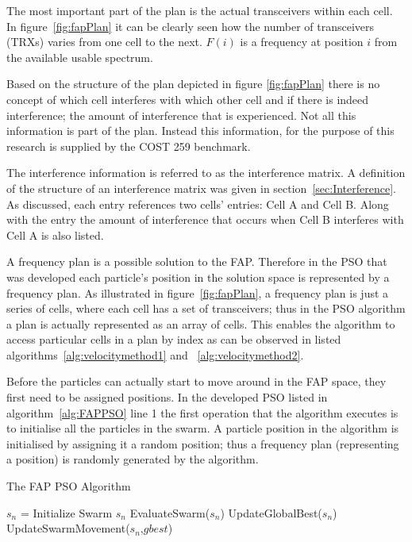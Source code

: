 The most important part of the plan is the actual transceivers within each cell. In figure~\ref{fig:fapPlan} it can be clearly seen how the number of transceivers (TRXs) varies from one cell to the next. $F(i)$ is a frequency at position $i$ from the available usable spectrum. 

Based on the structure of the plan depicted in figure \ref{fig:fapPlan} there is no concept of which cell interferes with which other cell and if there is indeed interference; the amount of interference that is experienced. Not all this information is part of the plan. Instead this information, for the purpose of this research is supplied by the COST 259 benchmark. 

The interference information is referred to as the interference matrix. A definition of the structure of an interference matrix was given in section~\ref{sec:Interference}. As discussed, each entry references two cells' entries: Cell A and Cell B. Along with the entry the amount of interference that occurs when Cell B interferes with Cell A is also listed.

A frequency plan is a possible solution to the \gls{FAP}. Therefore in the \gls{PSO} that was developed each particle's position in the solution space is represented by a frequency plan. As illustrated in figure~\ref{fig:fapPlan}, a frequency plan is just a series of cells, where each cell has a set of transceivers; thus in the \gls{PSO} algorithm a plan is actually represented as an array of cells. This enables the algorithm to access particular cells in a plan by index as can be observed in listed algorithms~\ref{alg:velocitymethod1} and ~\ref{alg:velocitymethod2}. 

Before the particles can actually start to move around in the \gls{FAP} space, they first need to be assigned positions. In the developed \gls{PSO} listed in algorithm~\ref{alg:FAPPSO} line 1 the first operation that the algorithm executes is to initialise all the particles in the swarm. A particle position in the algorithm is initialised by assigning it a random position; thus a frequency plan (representing a position) is randomly generated by the algorithm.
\begin{algorithm}[H]
\caption{The \gls{FAP} \gls{PSO} Algorithm}
\label{alg:FAPPSO}
\begin{algorithmic}
\State $s_n$ = Initialize Swarm $s_n$
	\State EvaluateSwarm($s_n$)
	\State UpdateGlobalBest($s_n$)
	\State UpdateSwarmMovement($s_n$,$gbest$)
\EndWhile
\end{algorithmic}
\end{algorithm}

